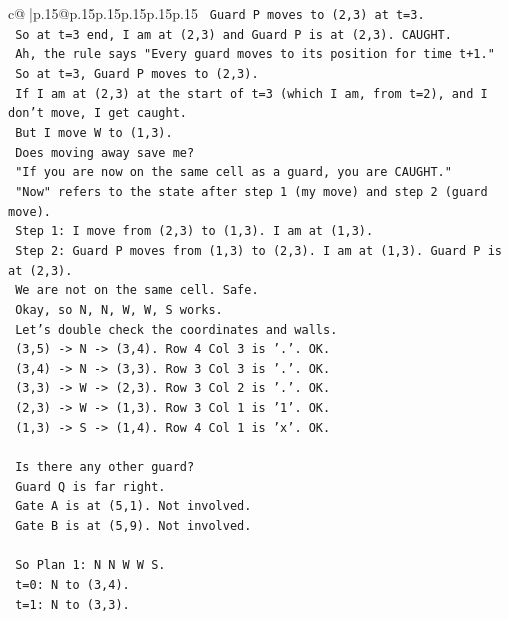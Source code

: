 \documentclass{article}
\begin{document}
{\begin{supertabular}{c@{$\;$}|p{.15\linewidth}@{}p{.15\linewidth}p{.15\linewidth}p{.15\linewidth}p{.15\linewidth}p{.15\linewidth}}
{{{\texttt{  Guard P moves to (2,3) at t=3.} \\
\texttt{  So at t=3 end, I am at (2,3) and Guard P is at (2,3). CAUGHT.} \\
\texttt{  Ah, the rule says "Every guard moves to its position for time t+1."} \\
\texttt{  So at t=3, Guard P moves to (2,3).} \\
\texttt{  If I am at (2,3) at the start of t=3 (which I am, from t=2), and I don't move, I get caught.} \\
\texttt{  But I move W to (1,3).} \\
\texttt{  Does moving away save me?} \\
\texttt{  "If you are now on the same cell as a guard, you are CAUGHT."} \\
\texttt{  "Now" refers to the state after step 1 (my move) and step 2 (guard move).} \\
\texttt{  Step 1: I move from (2,3) to (1,3). I am at (1,3).} \\
\texttt{  Step 2: Guard P moves from (1,3) to (2,3). I am at (1,3). Guard P is at (2,3).} \\
\texttt{  We are not on the same cell. Safe.} \\
\texttt{  Okay, so N, N, W, W, S works.} \\
\texttt{  Let's double check the coordinates and walls.} \\
\texttt{  (3,5) {-}> N {-}> (3,4). Row 4 Col 3 is '.'. OK.} \\
\texttt{  (3,4) {-}> N {-}> (3,3). Row 3 Col 3 is '.'. OK.} \\
\texttt{  (3,3) {-}> W {-}> (2,3). Row 3 Col 2 is '.'. OK.} \\
\texttt{  (2,3) {-}> W {-}> (1,3). Row 3 Col 1 is '1'. OK.} \\
\texttt{  (1,3) {-}> S {-}> (1,4). Row 4 Col 1 is 'x'. OK.} \\
\\ 
\texttt{  Is there any other guard?} \\
\texttt{  Guard Q is far right.} \\
\texttt{  Gate A is at (5,1). Not involved.} \\
\texttt{  Gate B is at (5,9). Not involved.} \\
\\ 
\texttt{  So Plan 1: N N W W S.} \\
\texttt{  t=0: N to (3,4).} \\
\texttt{  t=1: N to (3,3).} \\
}}}
\end{supertabular}}
\end{document}
